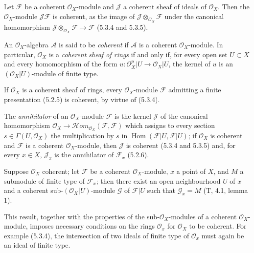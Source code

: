 \begin{env}[5.3.6]
\label{0.5.3.6}
Let $\mathcal{F}$ be a coherent $\mathcal{O}_X$-module and $\mathcal{J}$ a
coherent sheaf of ideals of $\mathcal{O}_X$. Then the
$\mathcal{O}_X$-module $\mathcal{J}\mathcal{F}$ is coherent, as the image
of $\mathcal{J}\otimes_{\mathcal{O}_X}\mathcal{F}$ under the canonical
homomorphism
$\mathcal{J}\otimes_{\mathcal{O}_X}\mathcal{F}\to\mathcal{F}$
(5.3.4 and 5.3.5).
\end{env}

\begin{env}[5.3.7]
\label{0.5.3.7}
An $\mathcal{O}_X$-algebra $\mathcal{A}$ is said to be \emph{coherent} if
$\mathcal{A}$ is a coherent $\mathcal{O}_X$-module. In particular,
$\mathcal{O}_X$ is a \emph{coherent sheaf of rings} if and only if,
for every open set $U\subset X$ and every homomorphism of the form
$u:\mathcal{O}_X^p|U\to\mathcal{O}_X|U$, the kernel of $u$ is an
$(\mathcal{O}_X|U)$-module of finite type.

If $\mathcal{O}_X$ is a coherent sheaf of rings, every
$\mathcal{O}_X$-module $\mathcal{F}$ admitting a finite presentation (5.2.5)
is coherent, by virtue of (5.3.4).

The \emph{annihilator} of an $\mathcal{O}_X$-module $\mathcal{F}$ is the kernel
$\mathcal{J}$ of the canonical homomorphism
$\mathcal{O}_X\to\mathcal{H}\!om_{\mathcal{O}_X}(\mathcal{F},\mathcal{F})$
which assigns to every section $s\in\Gamma(U,\mathcal{O}_X)$ the
multiplication by $s$ in
$\operatorname{Hom}(\mathcal{F}|U,\mathcal{F}|U)$; if $\mathcal{O}_X$ is
coherent and $\mathcal{F}$ is a coherent $\mathcal{O}_X$-module, then
$\mathcal{J}$ is coherent (5.3.4 and 5.3.5) and, for every $x\in X$,
$\mathcal{J}_x$ is the annihilator of $\mathcal{F}_x$ (5.2.6).
\end{env}


\begin{env}[5.3.8]
\label{0.5.3.8}
Suppose $\mathcal{O}_X$ coherent; let $\mathcal{F}$ be a coherent
$\mathcal{O}_X$-module, $x$ a point of $X$, and $M$ a submodule of
finite type of $\mathcal{F}_x$; then there exist an open neighbourhood $U$ of $x$
and a coherent sub-$(\mathcal{O}_X|U)$-module $\mathcal{G}$ of
$\mathcal{F}|U$ such that $\mathcal{G}_x=M$ (T, 4.1, lemma 1).

This result, together with the properties of the sub-$\mathcal{O}_X$-modules of a
coherent $\mathcal{O}_X$-module, imposes necessary conditions on the rings
$\mathcal{O}_x$ for $\mathcal{O}_X$ to be coherent. For example (5.3.4),
the intersection of two ideals of finite type of $\mathcal{O}_x$ must again be
an ideal of finite type.
\end{env}


